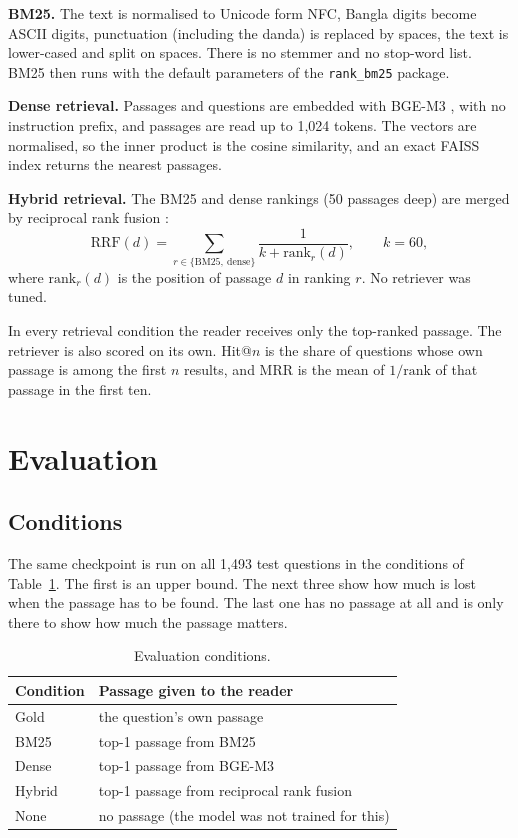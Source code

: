 \textbf{BM25.} The text is normalised to Unicode form NFC, Bangla digits become ASCII digits, punctuation (including the danda) is replaced by spaces, the text is lower-cased and split on spaces. There is no stemmer and no stop-word list. BM25 \cite{robertson2009bm25} then runs with the default parameters of the \texttt{rank\_bm25} package.

\textbf{Dense retrieval.} Passages and questions are embedded with BGE-M3 \cite{chen2024bgem3}, with no instruction prefix, and passages are read up to 1,024 tokens. The vectors are normalised, so the inner product is the cosine similarity, and an exact FAISS index \cite{johnson2019faiss} returns the nearest passages.

\textbf{Hybrid retrieval.} The BM25 and dense rankings (50 passages deep) are merged by reciprocal rank fusion \cite{cormack2009rrf}:
\begin{equation}
	\mathrm{RRF}(d) = \sum_{r \in \{\text{BM25},\ \text{dense}\}} \frac{1}{k + \mathrm{rank}_r(d)}, \qquad k = 60,
\end{equation}
where $\mathrm{rank}_r(d)$ is the position of passage $d$ in ranking $r$. No retriever was tuned.

In every retrieval condition the reader receives only the top-ranked passage. The retriever is also scored on its own. Hit@$n$ is the share of questions whose own passage is among the first $n$ results, and MRR is the mean of $1/\text{rank}$ of that passage in the first ten.

\section{Evaluation}

\subsection{Conditions}

The same checkpoint is run on all 1,493 test questions in the conditions of Table~\ref{tab:conditions}. The first is an upper bound. The next three show how much is lost when the passage has to be found. The last one has no passage at all and is only there to show how much the passage matters.

\begin{table}[H]
	\centering
	\caption{Evaluation conditions.}
	\label{tab:conditions}
	\begin{tabular}{ll}
		\toprule
		Condition & Passage given to the reader \\
		\midrule
		Gold & the question's own passage \\
		BM25 & top-1 passage from BM25 \\
		Dense & top-1 passage from BGE-M3 \\
		Hybrid & top-1 passage from reciprocal rank fusion \\
		None & no passage (the model was not trained for this) \\
		\bottomrule
	\end{tabular}
\end{table}

